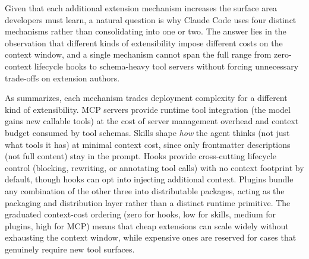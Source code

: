 Given that each additional extension mechanism increases the surface area developers must learn, a natural question is why Claude Code uses four distinct mechanisms rather than consolidating into one or two. The answer lies in the observation that different kinds of extensibility impose different costs on the context window, and a single mechanism cannot span the full range from zero-context lifecycle hooks to schema-heavy tool servers without forcing unnecessary trade-offs on extension authors.

\begin{table}[h]
  \centering
  \small
  \renewcommand{\arraystretch}{1.15}
  \caption{What each extension mechanism uniquely provides. Context cost refers to how much of the bounded context window the mechanism consumes when active.}
  \label{tab:ext-why-four}
\end{table}

As  summarizes, each mechanism trades deployment complexity for a different kind of extensibility. MCP servers provide runtime tool integration (the model gains new callable tools) at the cost of server management overhead and context budget consumed by tool schemas. Skills shape \emph{how} the agent thinks (not just what tools it has) at minimal context cost, since only frontmatter descriptions (not full content) stay in the prompt. Hooks provide cross-cutting lifecycle control (blocking, rewriting, or annotating tool calls) with no context footprint by default, though hooks can opt into injecting additional context. Plugins bundle any combination of the other three into distributable packages, acting as the packaging and distribution layer rather than a distinct runtime primitive. The graduated context-cost ordering (zero for hooks, low for skills, medium for plugins, high for MCP) means that cheap extensions can scale widely without exhausting the context window, while expensive ones are reserved for cases that genuinely require new tool surfaces.

